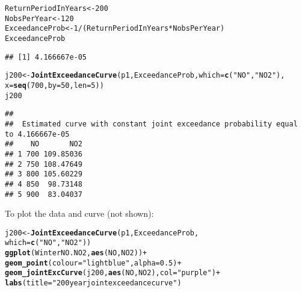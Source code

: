 \documentclass[10pt]{article}\usepackage[]{graphicx}\usepackage[]{color}
\makeatletter
\newcommand{\hlnum}[1]{\textcolor[rgb]{0.686,0.059,0.569}{#1}}%
\newcommand{\hlstr}[1]{\textcolor[rgb]{0.192,0.494,0.8}{#1}}%
\newcommand{\hlopt}[1]{\textcolor[rgb]{0,0,0}{#1}}%
\newcommand{\hlstd}[1]{\textcolor[rgb]{0.345,0.345,0.345}{#1}}%
\newcommand{\hlkwb}[1]{\textcolor[rgb]{0.69,0.353,0.396}{#1}}%
\newcommand{\hlkwc}[1]{\textcolor[rgb]{0.333,0.667,0.333}{#1}}%
\newcommand{\hlkwd}[1]{\textcolor[rgb]{0.737,0.353,0.396}{\textbf{#1}}}%
\newenvironment{kframe}{%
 \def\at@end@of@kframe{}%
 \ifinner\ifhmode%
  \def\at@end@of@kframe{\end{minipage}}%
  \begin{minipage}{\columnwidth}%
 \fi\fi%
 \def\FrameCommand##1{\hskip\@totalleftmargin \hskip-\fboxsep
 \colorbox{shadecolor}{##1}\hskip-\fboxsep
     \hskip-\linewidth \hskip-\@totalleftmargin \hskip\columnwidth}%
 \MakeFramed {\advance\hsize-\width
   \@totalleftmargin\z@ \linewidth\hsize
   \@setminipage}}%
 {\par\unskip\endMakeFramed%
 \at@end@of@kframe}
\newenvironment{knitrout}{}{} %
\makeatother
\begin{document}
\begin{knitrout}
\color{fgcolor}\begin{kframe}
\begin{alltt}
\hlstd{ReturnPeriodInYears} \hlkwb{<-} \hlnum{200}
\hlstd{NobsPerYear} \hlkwb{<-} \hlnum{120}
\hlstd{ExceedanceProb} \hlkwb{<-} \hlnum{1}\hlopt{/} \hlstd{(ReturnPeriodInYears} \hlopt{*} \hlstd{NobsPerYear)}
\hlstd{ExceedanceProb}
\end{alltt}
\begin{verbatim}
## [1] 4.166667e-05
\end{verbatim}
\end{kframe}
\end{knitrout}

\begin{knitrout}
\color{fgcolor}\begin{kframe}
\begin{alltt}
\hlstd{j200} \hlkwb{<-} \hlkwd{JointExceedanceCurve}\hlstd{(p1,ExceedanceProb,}\hlkwc{which}\hlstd{=}\hlkwd{c}\hlstd{(}\hlstr{"NO"}\hlstd{,}\hlstr{"NO2"}\hlstd{),}
                             \hlkwc{x}\hlstd{=}\hlkwd{seq}\hlstd{(}\hlnum{700}\hlstd{,}\hlkwc{by}\hlstd{=}\hlnum{50}\hlstd{,}\hlkwc{len}\hlstd{=}\hlnum{5}\hlstd{))}
\hlstd{j200}
\end{alltt}
\begin{verbatim}
## 
##  Estimated curve with constant joint exceedance probability equal to 4.166667e-05 
##    NO       NO2
## 1 700 109.85036
## 2 750 108.47649
## 3 800 105.60229
## 4 850  98.73148
## 5 900  83.04037
\end{verbatim}
\end{kframe}
\end{knitrout}

To plot the data and curve (not shown):

\begin{knitrout}
\color{fgcolor}\begin{kframe}
\begin{alltt}
\hlstd{j200} \hlkwb{<-} \hlkwd{JointExceedanceCurve}\hlstd{(p1,ExceedanceProb,}
                             \hlkwc{which}\hlstd{=}\hlkwd{c}\hlstd{(}\hlstr{"NO"}\hlstd{,}\hlstr{"NO2"}\hlstd{))}
\hlkwd{ggplot}\hlstd{(WinterNO.NO2,}\hlkwd{aes}\hlstd{(NO,NO2))}\hlopt{+}
    \hlkwd{geom_point}\hlstd{(}\hlkwc{colour}\hlstd{=}\hlstr{"light blue"}\hlstd{,}\hlkwc{alpha}\hlstd{=}\hlnum{0.5}\hlstd{)} \hlopt{+}
    \hlkwd{geom_jointExcCurve}\hlstd{(j200,}\hlkwd{aes}\hlstd{(NO,NO2),}\hlkwc{col}\hlstd{=}\hlstr{"purple"}\hlstd{)} \hlopt{+}
    \hlkwd{labs}\hlstd{(}\hlkwc{title}\hlstd{=}\hlstr{"200 year joint exceedance curve"}\hlstd{)}
\end{alltt}
\end{kframe}
\end{knitrout}



\end{document}
